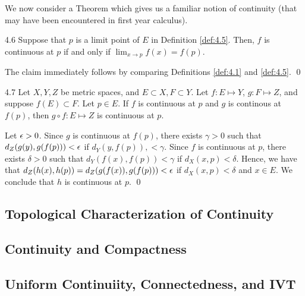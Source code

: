 We now consider a Theorem which gives us a familiar notion of continuity (that may have been encountered in first year calculus).

\begin{theorem}{}{4.6}
    Suppose that $p$ is a limit point of $E$ in Definition \ref{def:4.5}. Then, $f$ is continuous at $p$ if and only if $\lim_{x \rightarrow p}f(x) = f(p)$. 
\end{theorem}
\begin{nproof}
    The claim immediately follows by comparing Definitions \ref{def:4.1} and \ref{def:4.5}. \qed
\end{nproof}

\begin{theorem}{}{4.7}
    Let $X, Y, Z$ be metric spaces, and $E \subset X, F \subset Y$. Let $f: E \mapsto Y$, $g: F \mapsto Z$, and suppose $f(E) \subset F$. Let $p \in E$. If $f$ is continuous at $p$ and $g$ is continous at $f(p)$, then $g \circ f: E \mapsto Z$ is continuous at $p$.
\end{theorem}
\begin{nproof}
    Let $\epsilon > 0$. Since $g$ is continuous at $f(p)$, there exists $\gamma > 0$ such that $d_Z(g(y), g(f(p))) < \epsilon$ if $d_Y(y, f(p)) ,< \gamma$. Since $f$ is continuous at $p$, there exists $\delta > 0$ such that $d_Y(f(x), f(p)) < \gamma$ if $d_X(x, p) < \delta$. Hence, we have that $d_Z(h(x), h(p)) = d_Z(g(f(x)), g(f(p))) < \epsilon$ if $d_X(x, p) < \delta$ and $x \in E$. We conclude that $h$ is continuous at $p$. \qed
\end{nproof}

\subsection{Topological Characterization of Continuity}

\subsection{Continuity and Compactness}

\subsection{Uniform Continuiity, Connectedness, and IVT}

